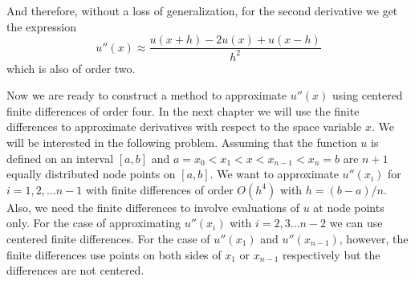 \documentclass[00main.tex]{subfiles}
\begin{document}
And therefore, without a loss of generalization, for the second derivative we get the expression \[  u'' (x) \approx \frac{u(x+h) - 2 u(x) + u(x-h)}{h^2} \] which is also of order two. %






Now we are ready to construct a method to approximate $u''(x)$ using centered finite differences of order four. In the next chapter we will use the finite differences to approximate derivatives with respect to the space variable $x$. %
We will be interested in the following problem. Assuming that the function $u$ is defined on an interval $[a,b]$ and $a = x_0 < x_1 < x < x_{n-1} < x_n = b$ are $n+1$ equally distributed node points on $[a,b]$. We want to approximate $u''(x_i)$ for $i=1,2,\hdots n-1$ with finite differences of order $O(h^4)$ with $h=(b-a)/n$. Also, we need the finite differences to involve evaluations of $u$ at node points only. For the case of approximating $u''(x_i)$ with $i=2,3\hdots n-2$ we can use centered finite differences. For the case of $u''(x_1)$ and $u''(x_{n-1})$, however, the finite differences use points on both sides of $x_1$ or $x_{n-1}$ respectively but the differences are not centered.
\end{document}
